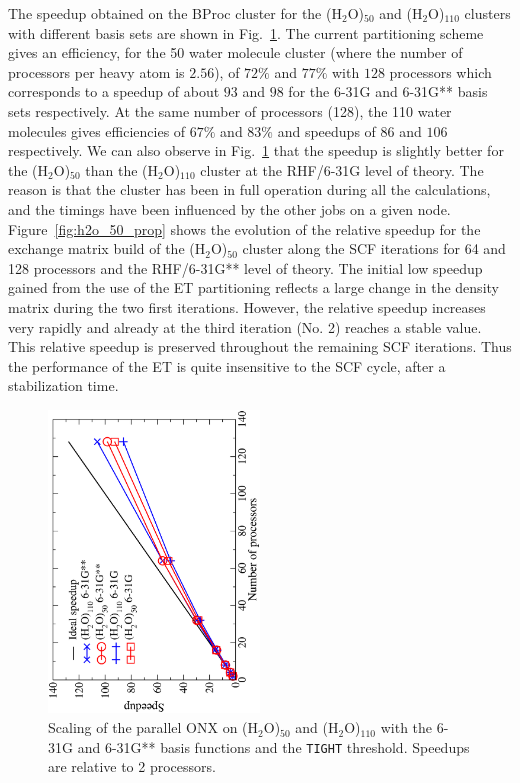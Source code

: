 \documentclass[prl,twocolumn,twocolumngrid,superbib]{revtex4} %
\begin{document}
 The speedup obtained on the BProc cluster for the (H$_2$O)$_{50}$ 
 and (H$_2$O)$_{110}$ clusters 
 with different basis sets are shown in Fig.~\ref{fig:h2o_50_110}. 
 The current partitioning scheme
 gives an efficiency, for the 50 water molecule cluster 
 (where the number of processors per heavy atom is $2.56$), 
 of $72\%$ and $77\%$ with $128$ processors which 
 corresponds to a speedup of about $93$ and $98$ for 
 the 6-31G and 6-31G** basis sets respectively.  
 At the same number of processors (128), the 110 water molecules gives efficiencies of
 $67\%$ and $83\%$ and speedups of $86$ and $106$ respectively.
 We can also observe in Fig.~\ref{fig:h2o_50_110} that the speedup is slightly better
 for the (H$_2$O)$_{50}$ than the (H$_2$O)$_{110}$ cluster at the RHF/6-31G level of theory.
 The reason is that the cluster has been in full operation during all the calculations, 
 and the timings have been influenced by the other jobs on a given node.  
 Figure~\ref{fig:h2o_50_prop} shows the evolution of the relative speedup for
 the exchange matrix build of
 the (H$_2$O)$_{50}$ cluster along the SCF iterations for 
 64 and 128 processors and the RHF/6-31G** level of theory. 
 The initial low speedup gained from the use of the ET partitioning  
 reflects a large change in the density matrix during the two first 
 iterations. However, the relative speedup increases very 
 rapidly and already at the third iteration (No. 2) reaches a stable value.
 This relative speedup is preserved throughout the remaining SCF iterations.
 Thus the performance of the ET is quite insensitive to the SCF cycle, after
 a stabilization time.


\begin{figure}[h]
  \caption{\protect
    Scaling of the parallel ONX on (H$_2$O)$_{50}$ 
    and (H$_2$O)$_{110}$ with the 6-31G and 6-31G**
    basis functions and the {\tt TIGHT} threshold.
    Speedups are relative to 2 processors.
  }\label{fig:h2o_50_110}
  \includegraphics[angle=-90,width=0.5\textwidth]{h2o_50_110}
\end{figure}
\end{document}
